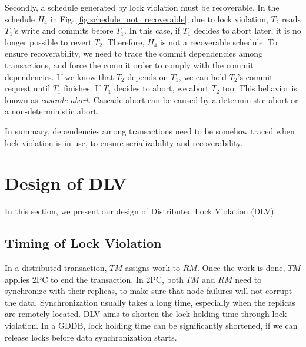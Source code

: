 \documentclass[conference]{IEEEtran}
\begin{document}
Secondly, a schedule generated by lock violation must be recoverable.
In the schedule ${H_4}$ in Fig.   \ref{fig:schedule_not_recoverable}, due to lock violation,
${T_2}$ reads  ${T_1}$'s write and commits before ${T_1}$.
In this case, if ${T_1}$ decides to abort later, it is no longer possible to revert ${T_2}$.
Therefore, ${H_4}$ is not a recoverable schedule.
To ensure recoverability, we need to trace the commit dependencies among transactions, and force the commit order to comply with the commit dependencies.
If we know that ${T_2}$ depends on ${T_1}$, we can hold ${T_2}$'s commit request until ${T_1}$ finishes.
If ${T_1}$ decides to abort, we abort ${T_2}$ too.
This behavior is known as \emph{cascade abort}.
Cascade abort can be caused by a deterministic abort or a non-deterministic abort.

In summary, dependencies among transactions need to be somehow traced when lock violation is in use, to ensure serializability and recoverability.

\section{Design of DLV}
\label{sec:implement}

In this section, we present our design of Distributed Lock Violation (DLV).

\subsection {Timing of Lock Violation}


In a distributed transaction, $TM$ assigns work to $RM$. Once the work is done, $TM$ applies 2PC to end the transaction.
In 2PC, both $TM$ and $RM$ need to synchronize with their replicas, to make sure that node failures will not corrupt the data.
Synchronization usually takes a long time, especially when the replicas are remotely located.
DLV aims to shorten the lock holding time through lock violation.
In a GDDB, lock holding time can be significantly shortened, if we can release locks before data synchronization starts.
\end{document}
